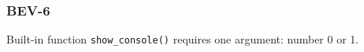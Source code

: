\subsubsection{BEV-6}\label{sec:error_code_bev_6}

Built-in function \texttt{show\_console()} requires one argument: number 0 or 1.


